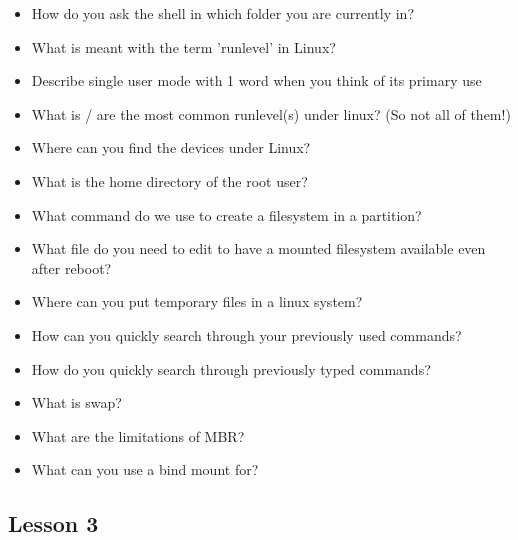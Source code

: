 \documentclass{article}
\begin{document}
\begin{itemize}
    \item How do you ask the shell in which folder you are currently in?
    \item What is meant with the term 'runlevel' in Linux?
    \item Describe single user mode with 1 word when you think of its primary use
    \item What is / are the most common runlevel(s) under linux? (So not all of them!)
    \item Where can you find the devices under Linux?
    \item What is the home directory of the root user?
    \item What command do we use to create a filesystem in a partition?
    \item What file do you need to edit to have a mounted filesystem available even after reboot?
    \item Where can you put temporary files in a linux system?
    \item How can you quickly search through your previously used commands?
    \item How do you quickly search through previously typed commands?
    \item What is swap?
    \item What are the limitations of MBR?
    \item What can you use a bind mount for?
\end{itemize}

\subsection{Lesson 3}
\end{document}
